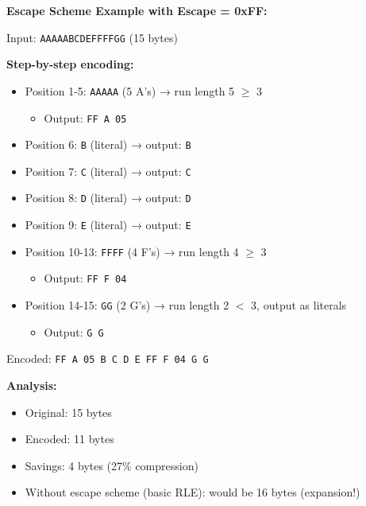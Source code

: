 \begin{examplebox}
\textbf{Escape Scheme Example with Escape = 0xFF:}

Input: \texttt{AAAAABCDEFFFFGG} (15 bytes)

\textbf{Step-by-step encoding:}
\begin{itemize}
    \item Position 1-5: \texttt{AAAAA} (5 A's) → run length 5 $\ge$ 3
    \begin{itemize}
        \item Output: \texttt{FF A 05}
    \end{itemize}
    \item Position 6: \texttt{B} (literal) → output: \texttt{B}
    \item Position 7: \texttt{C} (literal) → output: \texttt{C}
    \item Position 8: \texttt{D} (literal) → output: \texttt{D}
    \item Position 9: \texttt{E} (literal) → output: \texttt{E}
    \item Position 10-13: \texttt{FFFF} (4 F's) → run length 4 $\ge$ 3
    \begin{itemize}
        \item Output: \texttt{FF F 04}
    \end{itemize}
    \item Position 14-15: \texttt{GG} (2 G's) → run length 2 $<$ 3, output as literals
    \begin{itemize}
        \item Output: \texttt{G G}
    \end{itemize}
\end{itemize}

Encoded: \texttt{FF A 05 B C D E FF F 04 G G}

\textbf{Analysis:}
\begin{itemize}
    \item Original: 15 bytes
    \item Encoded: 11 bytes
    \item Savings: 4 bytes (27\% compression)
    \item Without escape scheme (basic RLE): would be 16 bytes (expansion!)
\end{itemize}
\end{examplebox}

